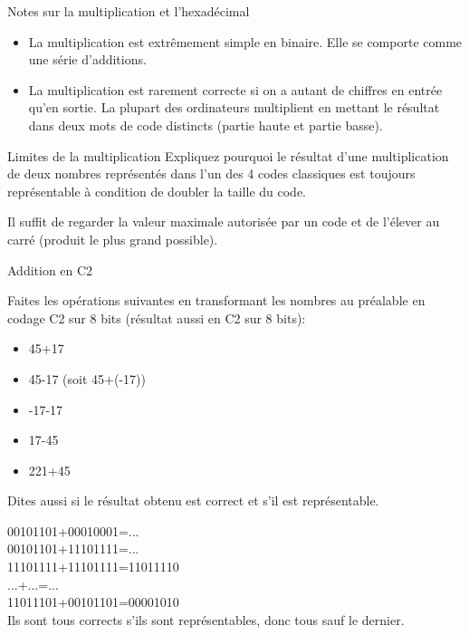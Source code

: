 \begin{frame}{Notes sur la multiplication et l'hexadécimal}
  \begin{itemize}
  \item La multiplication est extrêmement simple en binaire. Elle se comporte comme une série d'additions.
  \item La multiplication est rarement correcte si on a autant de
    chiffres en entrée qu'en sortie. La plupart des ordinateurs
    multiplient en mettant le résultat dans deux mots de code distincts
    (partie haute et partie basse).
  \end{itemize}
\end{frame}
\begin{exercice}
  \begin{exercicelet}{Limites de la multiplication}
    Expliquez pourquoi le résultat d'une multiplication de deux nombres
    représentés dans l'un des 4 codes classiques est toujours
    représentable à condition de doubler la taille du code.
    \begin{xcorrection}
      Il suffit de regarder la valeur maximale autorisée par un code et
      de l'élever au carré (produit le plus grand possible).
    \end{xcorrection}
  \end{exercicelet}
  \begin{exercicelet}{Addition en C2}
    \begin{questions}
    \item Faites les opérations suivantes en transformant les nombres au
      préalable en codage C2 sur 8 bits (résultat aussi en C2 sur 8 bits):
      \begin{itemize}
      \item 45+17
      \item 45-17 (soit 45+(-17))
      \item -17-17
      \item 17-45
      \item 221+45
      \end{itemize}
      Dites aussi si le résultat obtenu est correct et s'il est représentable.
      \begin{xcorrection}
        00101101+00010001=...\\
        00101101+11101111=...\\
        11101111+11101111=11011110\\
        ...+...=...\\ %
        11011101+00101101=00001010\\
        Ils sont tous corrects s'ils sont représentables, donc tous sauf le dernier.
      \end{xcorrection}
    \end{questions}
  \end{exercicelet}
\end{exercice}

